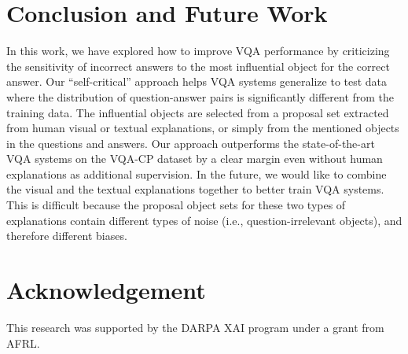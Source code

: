 \documentclass{article}
\begin{document}
\section{Conclusion and Future Work}
In this work, we have explored how to improve VQA performance by criticizing the sensitivity of incorrect answers to the most influential object for the correct answer. Our ``self-critical'' approach helps VQA systems generalize to test data where the distribution of question-answer pairs is significantly different from the training data. The influential objects are selected from a proposal set extracted from human visual or textual explanations, or simply from the mentioned objects in the questions and answers. Our approach outperforms the state-of-the-art VQA systems on the VQA-CP dataset by a clear margin even without human explanations as additional supervision. In the future, we would like to combine the visual and the textual explanations together to better train VQA systems. This is difficult because the proposal object sets for these two types of explanations contain different types of noise (i.e., question-irrelevant objects), and therefore different biases.

\section*{Acknowledgement}
This research was supported by the DARPA XAI program under a grant from AFRL. 


\end{document}
